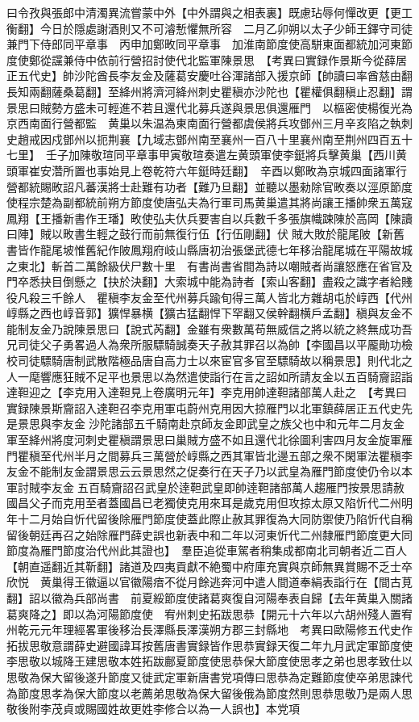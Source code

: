 曰令孜與張郎中清濁異流嘗蒙中外【中外謂與之相表裏】既慮玷辱何憚改更【更工衡翻】今日於隱處謝酒則又不可濬慙懼無所容　二月乙卯朔以太子少師王鐸守司徒兼門下侍郎同平章事　丙申加鄭畋同平章事　加淮南節度使高駢東面都統加河東節度使鄭從讜兼侍中依前行營招討使代北監軍陳景思　【考異曰實録作景斯今從薛居正五代史】帥沙陀酋長李友金及薩葛安慶吐谷渾諸部入援京師【帥讀曰率酋慈由翻長知兩翻薩桑葛翻】至絳州將濟河絳州刺史瞿稹亦沙陀也【瞿權俱翻稹止忍翻】謂景思曰賊勢方盛未可輕進不若且還代北募兵遂與景思俱還雁門　以樞密使楊復光為京西南面行營都監　黄巢以朱温為東南面行營都虞侯將兵攻鄧州三月辛亥陷之執刺史趙戒因戍鄧州以扼荆襄【九域志鄧州南至襄州一百八十里襄州南至荆州四百五十七里】　壬子加陳敬瑄同平章事甲寅敬瑄奏遣左黄頭軍使李鋌將兵擊黄巢【西川黄頭軍崔安濳所置也事始見上卷乾符六年鋌時廷翻】　辛酉以鄭畋為京城四面諸軍行營都統賜畋詔凡蕃漢將士赴難有功者【難乃旦翻】並聽以墨勑除官畋奏以涇原節度使程宗楚為副都統前朔方節度使唐弘夫為行軍司馬黄巢遣其將尚讓王播帥衆五萬寇鳳翔【王播新書作王璠】畋使弘夫㐲兵要害自以兵數千多張旗幟踈陳於高岡【陳讀曰陣】賊以畋書生輕之鼓行而前無復行伍【行伍剛翻】伏賊大敗於龍尾陂【新舊書皆作龍尾坡惟舊紀作陂鳳翔府岐山縣唐初治張堡武德七年移治龍尾城在平陽故城之東北】斬首二萬餘級伏尸數十里　有書尚書省間為詩以嘲賊者尚讓怒應在省官及門卒悉抉目倒懸之【抉於決翻】大索城中能為詩者【索山客翻】盡殺之識字者給賤役凡殺三千餘人　瞿稹李友金至代州募兵踰旬得三萬人皆北方雜胡屯於崞西【代州崞縣之西也崞音郭】獷悍暴横【獷古猛翻悍下罕翻又侯幹翻横戶孟翻】稹與友金不能制友金乃說陳景思曰【說式芮翻】金雖有衆數萬苟無威信之將以統之終無成功吾兄司徒父子勇畧過人為衆所服驃騎誠奏天子赦其罪召以為帥【李國昌以平龎勛功檢校司徒驃騎唐制武散階極品唐自高力士以來宦官多官至驃騎故以稱景思】則代北之人一麾響應狂賊不足平也景思以為然遣使詣行在言之詔如所請友金以五百騎齎詔詣達靼迎之【李克用入達靼見上卷廣明元年】李克用帥達靼諸部萬人赴之　【考異曰實録陳景斯齎詔入達靼召李克用軍屯蔚州克用因大掠雁門以北軍鎮薛居正五代史先是景思與李友金沙陀諸部五千騎南赴京師友金即武皇之族父也中和元年二月友金軍至絳州將度河刺史瞿稹謂景思曰巢賊方盛不如且還代北徐圖利害四月友金旋軍雁門瞿稹至代州半月之間募兵三萬營於崞縣之西其軍皆北邊五部之衆不閑軍法瞿稹李友金不能制友金謂景思云云景思然之促奏行在天子乃以武皇為雁門節度使仍令以本軍討賊李友金五百騎齎詔召武皇於逹靼武皇即帥逹靼諸部萬人趨雁門按景思請赦國昌父子而克用至者蓋國昌已老獨使克用來耳是歲克用但攻掠太原又陷忻代二州明年十二月始自忻代留後除雁門節度使蓋此際止赦其罪復為大同防禦使乃陷忻代自稱留後朝廷再召之始除雁門薛史誤也新表中和二年以河東忻代二州隸雁門節度更大同節度為雁門節度治代州此其證也】　羣臣追從車駕者稍集成都南北司朝者近二百人【朝直遥翻近其靳翻】諸道及四夷貢獻不絶蜀中府庫充實與京師無異賞賜不乏士卒欣悦　黄巢得王徽逼以官徽陽瘖不從月餘逃奔河中遣人間道奉絹表詣行在【間古莧翻】詔以徽為兵部尚書　前夏綏節度使諸葛爽復自河陽奉表自歸【去年黄巢入關諸葛爽降之】即以為河陽節度使　宥州刺史拓跋思恭【開元十六年以六胡州殘人置宥州乾元元年理經畧軍後移治長澤縣長澤漢朔方郡三封縣地　考異曰歐陽修五代史作拓拔思敬意謂薛史避國諱耳按舊唐書實録皆作思恭實録天復二年九月武定軍節度使李思敬以城降王建思敬本姓拓跋鄜夏節度使思恭保大節度使思孝之弟也思孝致仕以思敬為保大留後遂升節度又徙武定軍新唐書党項傳曰思恭為定難節度使卒弟思諫代為節度思孝為保大節度以老薦弟思敬為保大留後俄為節度然則思恭思敬乃是兩人思敬後附李茂貞或賜國姓故更姓李修合以為一人誤也】本党項